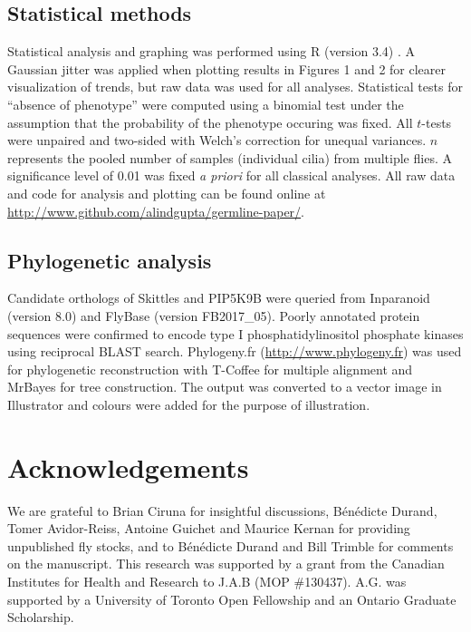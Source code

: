 \documentclass[12pt, twoside, letterpaper]{article}
\begin{document}
\begin{doublespacing}
\begin{linenumbers}
    \subsection*{Statistical methods}
    Statistical analysis and graphing was performed using R (version 3.4)
    \citep{r}.
    A Gaussian jitter was applied when plotting
    results in Figures 1 and 2 for clearer visualization of trends,
    but raw data was used for all analyses.
    Statistical tests for ``absence of phenotype'' were computed using a binomial test
    under the assumption that the probability of the phenotype occuring was fixed.
    All $t$-tests were unpaired and two-sided with Welch's correction for unequal variances.
    $n$ represents the pooled number of samples (individual cilia) from multiple flies.
    A significance level of 0.01 was fixed \textit{a priori} for all classical analyses.
    All raw data and code for analysis and plotting can be found online
    at \url{http://www.github.com/alindgupta/germline-paper/}.

    \subsection*{Phylogenetic analysis}
    Candidate orthologs of Skittles and PIP5K9B were queried
    from Inparanoid (version 8.0) and FlyBase (version FB2017\_05).
    Poorly annotated protein sequences were confirmed
    to encode type I phosphatidylinositol phosphate
    kinases using reciprocal BLAST search.
    Phylogeny.fr (\url{http://www.phylogeny.fr}) \citep{dereeper2008phylogeny} was used for
    phylogenetic reconstruction with T-Coffee for multiple alignment
    and MrBayes for tree construction.
    The output was converted to a vector image in Illustrator
    and colours were added for the purpose of illustration.

    \section*{Acknowledgements}
    We are grateful to Brian Ciruna for insightful discussions,
    B{\'e}n{\'e}dicte Durand, Tomer Avidor-Reiss, Antoine Guichet and Maurice Kernan for providing
    unpublished fly stocks, and to
    B{\'e}n{\'e}dicte Durand and Bill Trimble
    for comments on the manuscript.
    This research was supported by a grant from the Canadian Institutes for
    Health and Research to J.A.B (MOP \#130437).
    A.G. was supported by a
    University of Toronto Open Fellowship and
    an Ontario Graduate Scholarship.
    

\end{linenumbers}
\end{doublespacing}
\end{document}
